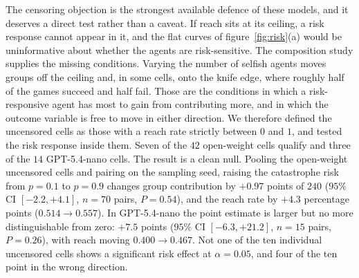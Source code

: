 \documentclass[openacc]{rsproca_new}
\begin{document}
The censoring objection is the strongest available defence of these models, and it deserves a direct test rather than a caveat. If reach sits at its ceiling, a risk response cannot appear in it, and the flat curves of figure~\ref{fig:risk}(a) would be uninformative about whether the agents are risk-sensitive. The composition study supplies the missing conditions. Varying the number of selfish agents moves groups off the ceiling and, in some cells, onto the knife edge, where roughly half of the games succeed and half fail. Those are the conditions in which a risk-responsive agent has most to gain from contributing more, and in which the outcome variable is free to move in either direction. We therefore defined the uncensored cells as those with a reach rate strictly between $0$ and $1$, and tested the risk response inside them. Seven of the $42$ open-weight cells qualify and three of the $14$ GPT-5.4-nano cells. The result is a clean null. Pooling the open-weight uncensored cells and pairing on the sampling seed, raising the catastrophe risk from $p=0.1$ to $p=0.9$ changes group contribution by $+0.97$ points of $240$ ($95\%$ CI $[-2.2,+4.1]$, $n=70$ pairs, $P=0.54$), and the reach rate by $+4.3$ percentage points ($0.514\to0.557$). In GPT-5.4-nano the point estimate is larger but no more distinguishable from zero: $+7.5$ points ($95\%$ CI $[-6.3,+21.2]$, $n=15$ pairs, $P=0.26$), with reach moving $0.400\to0.467$. Not one of the ten individual uncensored cells shows a significant risk effect at $\alpha=0.05$, and four of the ten point in the wrong direction.
\end{document}
